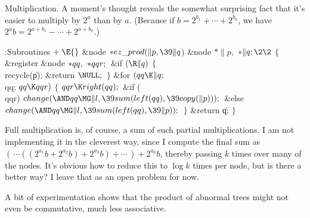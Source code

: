 Multiplication. A moment's thought reveals the somewhat surprising
fact that
it's easier to multiply by $2^a$ than by $a$. (Because if $b=2^{b_1}+\cdots
+2^{b_k}$, we have $2^ab=2^{a+b_1}-\cdots+2^{a+b_k}$.)

\Y\B\4:Subroutines\X${}\mathrel+\E{}$\6
\&{node} ${}{*}\\{ez\_prod}(\|p,\39\|q{}$)\1\1\6
\&{node} ${}{*}\|p,{}$ ${}{*}\|q;\2\2{}$\6
${}\{{}$\1\6
\&{register} \&{node} ${}{*}\\{qq},{}$ ${}{*}\\{qqr};{}$\7
\&{if} ${}(\R\|q){}$\5
${}\{{}$\1\6
\\{recycle}(\|p);\6
\&{return} ${}\NULL;{}$\6
\4${}\}{}$\2\6
\&{for} ${}(\\{qq}\K\|q;{}$ \\{qq}; ${}\\{qq}\K\\{qqr}){}$\5
${}\{{}$\1\6
${}\\{qqr}\K\\{right}(\\{qq});{}$\6
\&{if} (\\{qqr})\1\5
${}\\{change}({\AND}\\{qq}\MG\|l,\39\\{sum}(\\{left}(\\{qq}),\39\\{copy}(%
\|p)));{}$\2\6
\&{else}\1\5
${}\\{change}({\AND}\\{qq}\MG\|l,\39\\{sum}(\\{left}(\\{qq}),\39\|p));{}$\2\6
\4${}\}{}$\2\6
\&{return} \|q;\6
\4${}\}{}$\2\par
\fi

Full multiplication is, of course, a sum of such partial multiplications.
I am not implementing it in the cleverest way, since I compute the
final sum as $(\,\cdots((2^{a_1}b +2^{a_2}b)+2^{a_3}b)+\cdots\,)+2^{a_k}b$,
thereby passing $k$ times over many of the nodes. It's obvious how to
reduce this to $\log k$ times per node, but is there a better way?
I leave that as an open problem for now.

A bit of experimentation shows that the product of abnormal trees
might not even be commutative, much less associative.

